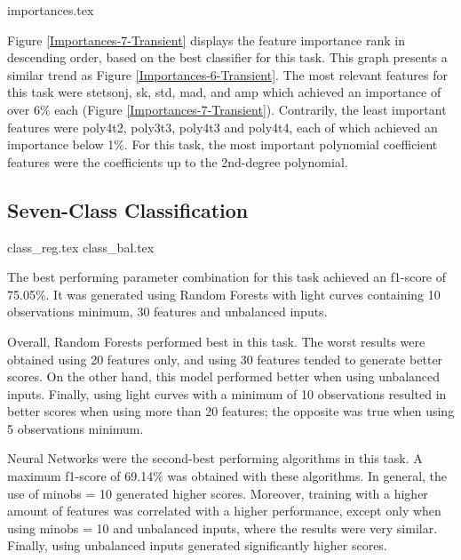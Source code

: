 \documentclass[a4paper,fleqn,usenatbib]{mnras}
\begin{document}


{importances.tex}

Figure \ref{Importances-7-Transient} displays the feature importance rank in descending order, based on the best classifier for this task. This graph presents a similar trend as Figure \ref{Importances-6-Transient}. The most relevant features for this task were stetson\textunderscore j, sk, std, mad, and amp which achieved an importance of over 6\% each (Figure \ref{Importances-7-Transient}). Contrarily, the least important features were poly4\textunderscore t2, poly3\textunderscore t3, poly4\textunderscore t3 and poly4\textunderscore t4, each of which achieved an importance below 1\%. For this task, the most important polynomial coefficient features were the coefficients up to the 2nd-degree polynomial. 


\subsection{Seven-Class Classification}

{class_reg.tex}
{class_bal.tex}

The best performing parameter combination for this task achieved an f1-score of 75.05\%. It was generated using Random Forests with light curves containing 10 observations minimum, 30 features and unbalanced inputs. 

Overall, Random Forests performed best in this task. The worst results were obtained using 20 features only, and using 30 features tended to generate better scores. On the other hand, this model performed better when using unbalanced inputs. Finally, using light curves with a minimum of 10 observations resulted in better scores when using more than 20 features; the opposite was true when using 5 observations minimum.

Neural Networks were the second-best performing algorithms in this task. A maximum f1-score of 69.14\% was obtained with these algorithms. In general, the use of min\textunderscore obs = 10 generated higher scores. Moreover, training with a higher amount of features was correlated with a higher performance, except only when using min\textunderscore obs = 10 and unbalanced inputs, where the results were very similar. Finally, using unbalanced inputs generated significantly higher scores.
\end{document}
